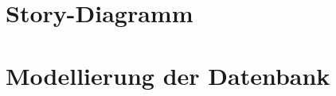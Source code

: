 \documentclass[12pt,a4paper,oneside,ngerman]{article}
\begin{document}
\section{Story-Diagramm}



\section{Modellierung der Datenbank}
\end{document}
